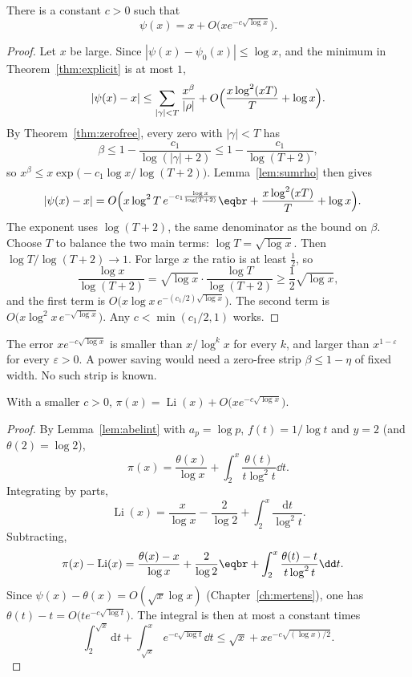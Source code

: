 \begin{theorem}\label{thm:pnterror}
There is a constant $c>0$ such that
\[
\psi(x)=x+O\bigl(xe^{-c\sqrt{\log x}}\bigr).
\]
\end{theorem}
\begin{proof}
Let $x$ be large. Since $|\psi(x)-\psi_0(x)|\le\log x$, and the minimum in Theorem~\ref{thm:explicit} is at most $1$,
\[
|\psi(x)-x|\le\sum_{|\gamma|<T}\frac{x^\beta}{|\rho|}+O\Bigl(\frac{x\log^2(xT)}T+\log x\Bigr).
\]
By Theorem~\ref{thm:zerofree}, every zero with $|\gamma|<T$ has
\[
\beta\le1-\frac{c_1}{\log(|\gamma|+2)}\le1-\frac{c_1}{\log(T+2)},
\]
so $x^\beta\le x\exp\bigl(-c_1\log x/\log(T+2)\bigr)$. Lemma~\ref{lem:sumrho} then gives
\[
\begin{aligned}|\psi(x)-x|&=O\Bigl(x\log^2T\,e^{-c_1\frac{\log x}{\log(T+2)}}\eqbr+\frac{x\log^2(xT)}T+\log x\Bigr).\end{aligned}
\]
The exponent uses $\log(T+2)$, the same denominator as the bound on $\beta$. Choose $T$ to balance the two main terms: $\log T=\sqrt{\log x}$. Then $\log T/\log(T+2)\to1$. For large $x$ the ratio is at least $\frac12$, so
\[
\frac{\log x}{\log(T+2)}=\sqrt{\log x}\cdot\frac{\log T}{\log(T+2)}\ge\frac12\sqrt{\log x},
\]
and the first term is $O\bigl(x\log x\,e^{-(c_1/2)\sqrt{\log x}}\bigr)$. The second term is $O\bigl(x\log^2x\,e^{-\sqrt{\log x}}\bigr)$. Any $c<\min(c_1/2,1)$ works.
\end{proof}

The error $xe^{-c\sqrt{\log x}}$ is smaller than $x/\log^kx$ for every $k$, and larger than $x^{1-\varepsilon}$ for every $\varepsilon>0$. A power saving would need a zero-free strip $\beta\le1-\eta$ of fixed width. No such strip is known.

\begin{corollary}\label{cor:pnterrorpi}
With a smaller $c>0$, $\pi(x)=\operatorname{Li}(x)+O\bigl(xe^{-c\sqrt{\log x}}\bigr)$.
\end{corollary}
\begin{proof}
By Lemma~\ref{lem:abelint} with $a_p=\log p$, $f(t)=1/\log t$ and $y=2$ (and $\theta(2)=\log2$),
\[
\pi(x)=\frac{\theta(x)}{\log x}+\int_2^x\frac{\theta(t)}{t\log^2t}\dd t.
\]
Integrating by parts,
\[
\operatorname{Li}(x)=\frac x{\log x}-\frac2{\log2}+\int_2^x\frac{\mathrm dt}{\log^2t}.
\]
Subtracting,
\[
\begin{aligned}\pi(x)-\operatorname{Li}(x)&=\frac{\theta(x)-x}{\log x}+\frac2{\log2}\eqbr+\int_2^x\frac{\theta(t)-t}{t\log^2t}\dd t.\end{aligned}
\]
Since $\psi(x)-\theta(x)=O(\sqrt x\log x)$ (Chapter~\ref{ch:mertens}), one has $\theta(t)-t=O\bigl(te^{-c\sqrt{\log t}}\bigr)$. The integral is then at most a constant times
\[
\int_2^{\sqrt x}\mathrm dt+\int_{\sqrt x}^xe^{-c\sqrt{\log t}}\dd t\le\sqrt x+xe^{-c\sqrt{(\log x)/2}}.
\]
\end{proof}

